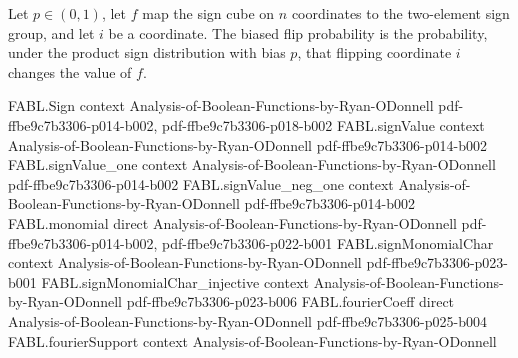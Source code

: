 \begin{definition}
\label{FABL.biasedFlipProbability}
\leanok
{}
Let $p\in(0,1)$, let $f$ map the sign cube on $n$ coordinates to the two-element sign
group, and let $i$ be a coordinate. The biased flip probability is the probability,
under the product sign distribution with bias $p$, that flipping coordinate $i$ changes
the value of $f$.
\end{definition}

\begin{theorem}
\label{FABL.productInfluence_biased_eq_sigma_sq_mul_flipProbability}
\leanok
{}
\proofstep
  {FABL.Sign}
  {context}
  {Analysis-of-Boolean-Functions-by-Ryan-ODonnell}
  {pdf-ffbe9c7b3306-p014-b002,
    pdf-ffbe9c7b3306-p018-b002}
\proofstep
  {FABL.signValue}
  {context}
  {Analysis-of-Boolean-Functions-by-Ryan-ODonnell}
  {pdf-ffbe9c7b3306-p014-b002}
\proofstep
  {FABL.signValue_one}
  {context}
  {Analysis-of-Boolean-Functions-by-Ryan-ODonnell}
  {pdf-ffbe9c7b3306-p014-b002}
\proofstep
  {FABL.signValue_neg_one}
  {context}
  {Analysis-of-Boolean-Functions-by-Ryan-ODonnell}
  {pdf-ffbe9c7b3306-p014-b002}
\proofstep
  {FABL.monomial}
  {direct}
  {Analysis-of-Boolean-Functions-by-Ryan-ODonnell}
  {pdf-ffbe9c7b3306-p014-b002,
    pdf-ffbe9c7b3306-p022-b001}
\proofstep
  {FABL.signMonomialChar}
  {context}
  {Analysis-of-Boolean-Functions-by-Ryan-ODonnell}
  {pdf-ffbe9c7b3306-p023-b001}
\proofstep
  {FABL.signMonomialChar_injective}
  {context}
  {Analysis-of-Boolean-Functions-by-Ryan-ODonnell}
  {pdf-ffbe9c7b3306-p023-b006}
\proofstep
  {FABL.fourierCoeff}
  {direct}
  {Analysis-of-Boolean-Functions-by-Ryan-ODonnell}
  {pdf-ffbe9c7b3306-p025-b004}
\proofstep
  {FABL.fourierSupport}
  {context}
  {Analysis-of-Boolean-Functions-by-Ryan-ODonnell}

\end{theorem}
